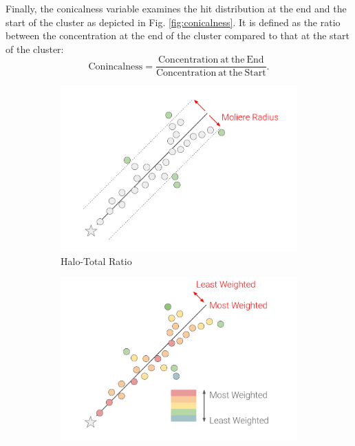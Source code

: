 Finally, the conicalness variable examines the hit distribution at the end and the start of the cluster as depicted in Fig. \ref{fig:conicalness}. 
It is defined as the ratio between the concentration at the end of the cluster compared to that at the start of the cluster:
\begin{equation}
	\mathrm{Conincalness = \frac{Concentration\ at\ the\ End}{Concentration\ at\ the\ Start}}.
\end{equation}

\begin{figure}[hb!]
        \centering
        \begin{subfigure}[b]{0.495\textwidth}
            \centering
            \includegraphics[width=\textwidth]{HaloTotalRatio}
            \caption{Halo-Total Ratio}%
            \label{fig:halototalratio}
        \end{subfigure}
        \hfill
        \begin{subfigure}[b]{0.495\textwidth}  
            \centering 
            \includegraphics[width=\textwidth]{Concentration}

\end{subfigure}
\end{figure}
